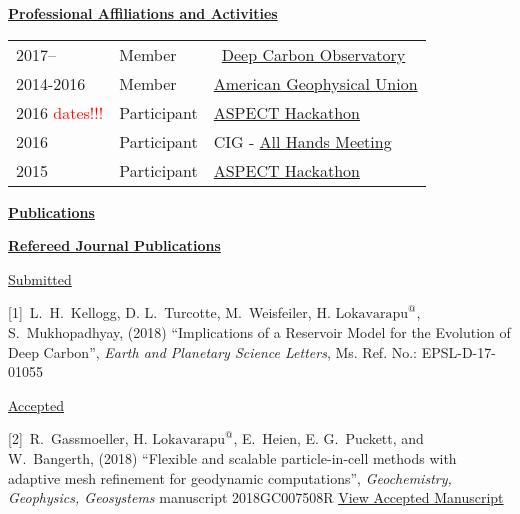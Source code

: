 \documentclass[11pt]{ltxdoc}
\begin{document}
\vskip 12pt

\begin{center}
	\textbf{\underline{Professional Affiliations and Activities}}
\end{center}

\vskip -06pt

\addtolength{\tabcolsep}{15pt}   
\begin{tabular}{lll}
  2017--     & Member & ~\href{https://deepcarbon.net/}{Deep Carbon Observatory} \\[06pt]
  2014-2016     & Member & 
 \href{ https://sites.agu.org}{ American Geophysical Union } \\[06pt]
  2016 \textcolor{red}{dates!!!} & Participant & \href{https://geodynamics.org/cig/events/calendar/2017-aspect-hack/}{ASPECT Hackathon} \\[06pt]
  2016     & Participant & CIG - \href{https://geodynamics.org/cig/events/calendar/2016-cig-all-hands-meeting/}{All Hands Meeting} \\[06pt]
  2015     & Participant & \href{https://geodynamics.org/cig/events/calendar/2016-cig-all-hands-meeting/2016-aspect-hack/?eID=1233}{ASPECT Hackathon}\\[06pt]
  

\end{tabular}
\addtolength{\tabcolsep}{1pt}  


\begin{center}
  \textbf{\underline{Publications}}
\end{center}

\noindent
\textbf{\underline{Refereed Journal Publications}}


\noindent
\underline{Submitted}

\hangindent 20pt
[1]~L.~H.~Kellogg, D. L.~Turcotte, M.~Weisfeiler, $\textrm{H.~Lokavarapu}^@$, S.~Mukhopadhyay, (2018) 
``Implications of a Reservoir Model for the
Evolution of Deep Carbon'', 
\textit{Earth and Planetary Science Letters}, Ms. Ref. No.:  EPSL-D-17-01055

\newpage

\noindent
\underline{Accepted}

\hangindent 20pt
[2]~R.~Gassmoeller,  $\textrm{H.~Lokavarapu}^@$, E.~Heien, E. G.~Puckett, and W.~Bangerth, (2018) 
``Flexible and scalable particle-in-cell methods with adaptive mesh refinement for geodynamic computations'', 
\textit{Geochemistry, Geophysics, Geosystems} manuscript 2018GC007508R 
\href{https://www.math.ucdavis.edu/~egp/PUBLICATIONS/JOURNAL_ARTICLES/ACCEPTED/RG-HL-EH-EGP-WB-2018.pdf}{View Accepted Manuscript}
\end{document}
